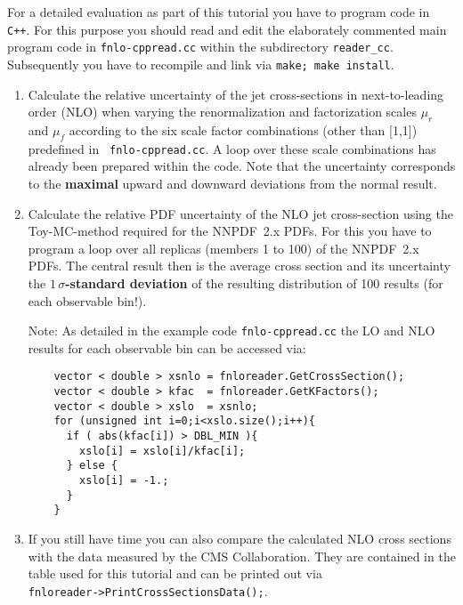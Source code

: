\documentclass[12pt,a4paper,twoside]{article}
\begin{document}
For a detailed evaluation as part of this tutorial you have to program
code in {\tt C++}\@. For this purpose you should read and edit the
elaborately commented main program code in {\tt fnlo-cppread.cc}
within the subdirectory {\tt reader\_cc}. Subsequently you have to
recompile and link via {\tt make; make install}.

\begin{enumerate}
\item Calculate the relative uncertainty of the jet cross-sections in
  next-to-leading order (NLO) when varying the renormalization and
  factorization scales $\mu_r$ and $\mu_f$ according to the six scale
  factor combinations (other than [1,1]) predefined in {\tt
    fnlo-cppread.cc}. A loop over these scale combinations has already
  been prepared within the code. Note that the uncertainty corresponds
  to the {\bf maximal} upward and downward deviations from the normal
  result.

\item Calculate the relative PDF uncertainty of the NLO jet
  cross-section using the Toy-MC-method required for the NNPDF~2.x
  PDFs. For this you have to program a loop over all replicas (members
  1 to 100) of the NNPDF~2.x PDFs.  The central result then is the
  average cross section and its uncertainty the {\bf
    $1\,\sigma$-standard deviation} of the resulting distribution of
  100 results (for each observable bin!).

  Note: As detailed in the example code {\tt fnlo-cppread.cc} the LO
  and NLO results for each observable bin can be accessed via:
\begin{verbatim}
    vector < double > xsnlo = fnloreader.GetCrossSection();
    vector < double > kfac  = fnloreader.GetKFactors();
    vector < double > xslo  = xsnlo;
    for (unsigned int i=0;i<xslo.size();i++){
      if ( abs(kfac[i]) > DBL_MIN ){
        xslo[i] = xslo[i]/kfac[i];
      } else {
        xslo[i] = -1.;
      }
    }
\end{verbatim}


\item If you still have time you can also compare the calculated NLO
  cross sections with the data measured by the CMS Collaboration.
  They are contained in the table used for this tutorial and can be
  printed out via\\
  {\tt fnloreader->PrintCrossSectionsData();}.
\end{enumerate}
\end{document}
